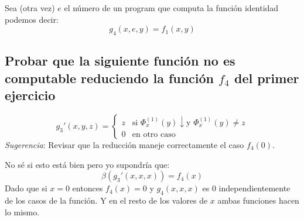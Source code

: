 \documentclass[fleqn, 11pt]{article}
\newcommand{\ddef}{\downarrow}
\begin{document}
Sea (otra vez) $e$ el número de un program que computa la función identidad
podemos decir:
\[
	g_4(x, e, y) = f_1(x, y)
\]

\subsection{Probar que la siguiente función no es computable reduciendo la
función $f_4$ del primer ejercicio}

\[
	g_3'(x, y, z) =
	\begin{cases}
		z & \text{si } \Phi^{(1)}_x(y) \ddef \text{y }
		    \Phi^{(1)}_x(y) \neq z \\
		0 & \text{en otro caso}
	\end{cases}
\]
\emph{Sugerencia}: Revisar que la reducción maneje correctamente el caso
$f_4(0)$.

No sé si esto está bien pero yo supondría que:
\[
	\beta(g_3'(x, x, x)) = f_4(x)
\] 
Dado que si $x = 0$ entonces $f_4(x) = 0$ y $g_4(x, x, x)$ es $0$
independientemente de los casos de la función. Y en el resto de los valores de
$x$ ambas funciones hacen lo mismo.
\end{document}

